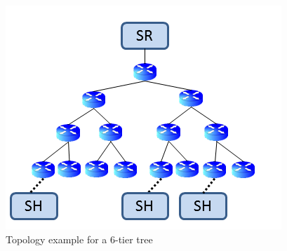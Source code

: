 \begin{figure}
\includegraphics[width=\columnwidth]{figure/topology.png}
\caption{\label{fig:topology}Topology example for a 6-tier tree}
\end{figure}
